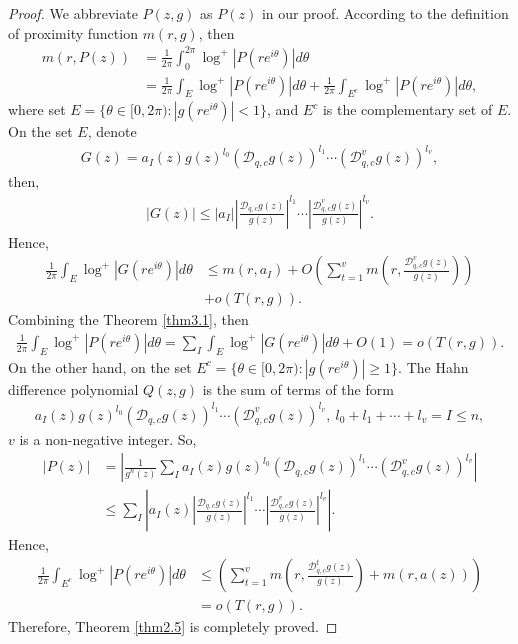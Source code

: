 \documentclass[sn-mathphys-num]{sn-jnl}%
\theoremstyle{thmstyleone}%
\theoremstyle{thmstyletwo}%
\theoremstyle{thmstylethree}%
\begin{document}
\begin{proof}
	\indent We abbreviate \(P(z,g)\) as \(P(z)\) in our proof. According to the definition of proximity function \(m(r,g)\), then
	\begin{align*}
		m(r,P(z))&=\frac{1}{2\pi}\int_{0}^{2\pi}\log^{+}|P(re^{i\theta})|d\theta\\
		&=\frac{1}{2\pi}\int_{E}\log^{+}|P(re^{i\theta})|d\theta+\frac{1}{2\pi}\int_{E^{c}}\log^{+}|P(re^{i\theta})|d\theta,
	\end{align*}
	where set \(E=\{\theta\in[0,2\pi):|g(re^{i\theta})|<1\}\), and \(E^{c}\) is the complementary set of \(E\). On the set \(E\), denote
	\begin{align*}
		G(z)=a_{I}(z)g(z)^{l_{0}}(\mathcal{D}_{q,c}g(z))^{l_{1}}\cdots(\mathcal{D}^{v}_{q,c}g(z))^{l_{v}},
	\end{align*}
	then,
	\begin{align*}
		|G(z)|\leq|a_{I}|\left|\frac{\mathcal{D}_{q,c}g(z)}{g(z)}\right|^{l_{1}}\cdots\left|\frac{\mathcal{D}^{v}_{q,c}g(z)}{g(z)}\right|^{l_{v}}.
	\end{align*}
	Hence,
	\begin{align*}
		\frac{1}{2\pi}\int_{E}\log^{+}|G(re^{i\theta})|d\theta&\leq m(r,a_{I})+O\left(\sum_{t=1}^{v}m\left(r,\frac{\mathcal{D}^{v}_{q,c}g(z)}{g(z)}\right)\right)\\
		&+o(T(r,g)).
	\end{align*}
	Combining the Theorem \ref{thm3.1}, then
	\begin{align*}
		\frac{1}{2\pi}\int_{E}\log^{+}|P(re^{i\theta})|d\theta=\sum_{I}\int_{E}\log^{+}|G(re^{i\theta})|d\theta+O(1)=o(T(r,g)).
	\end{align*}
	\indent On the other hand, on the set \(E^{c}=\{\theta\in[0,2\pi):|g(re^{i\theta})|\geq1\}\). The Hahn difference polynomial \(Q(z,g)\) is the sum of terms of the form
	\begin{align*}
		a_{I}(z)g(z)^{l_{0}}(\mathcal{D}_{q,c}g(z))^{l_{1}}\cdots(\mathcal{D}^{v}_{q,c}g(z))^{l_{v}},~l_{0}+l_{1}+\cdots+l_{v}=I\leq n,
	\end{align*}
	\(v\) is a non-negative integer. So,
	\begin{align*}
		|P(z)|&=\left|\frac{1}{g^{n}(z)}\sum_{I}a_{I}(z)g(z)^{l_{0}}(\mathcal{D}_{q,c}g(z))^{l_{1}}\cdots(\mathcal{D}^{v}_{q,c}g(z))^{l_{v}}\right|\\
		&\leq\sum_{I}\left|a_{I}(z)\left|\frac{\mathcal{D}_{q,c}g(z)}{g(z)}\right|^{l_{1}}\cdots
		\left|\frac{\mathcal{D}^{v}_{q,c}g(z)}{g(z)}\right|^{l_{v}}\right|.
	\end{align*}
	Hence,
	\begin{align*}
		 \frac{1}{2\pi}\int_{E^{c}}\log^{+}|P(re^{i\theta})|d\theta&\leq\left(\sum_{t=1}^{v}m\left(r,\frac{\mathcal{D}^{t}_{q,c}g(z)}{g(z)}\right)+m(r,a(z))\right)\\
		&=o(T(r,g)).
	\end{align*}
	Therefore, Theorem \ref{thm2.5} is completely proved.
\end{proof}
\end{document}
